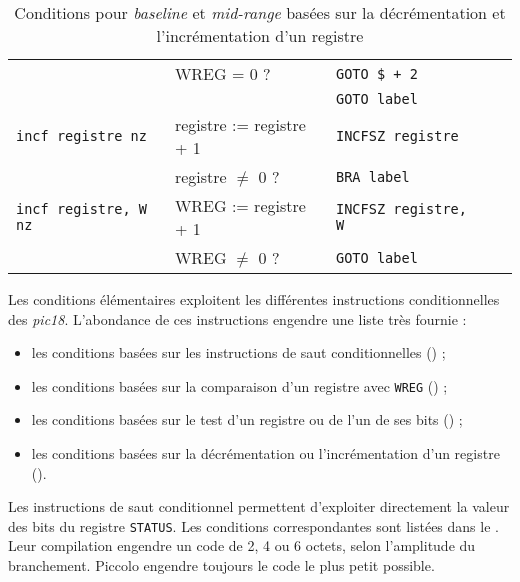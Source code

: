 \begin{table}[!ht]
\begin{tabular}{lllll}
    \rowcolor{\fondTableau}                           & WREG = 0 ?           &\texttt{GOTO \$ + 2}          \\
    \rowcolor{\fondTableau}                           &                      &\texttt{GOTO label}          \\
                           \texttt{incf registre nz}  & registre := registre + 1    &\texttt{INCFSZ registre}\\
                                                      & registre $\ne$ 0 ?              &\texttt{BRA label}   \\
    \rowcolor{\fondTableau}\texttt{incf registre, W nz}& WREG := registre + 1 &\texttt{INCFSZ registre, W}  \\
    \rowcolor{\fondTableau}                           & WREG $\ne$ 0 ?           &\texttt{GOTO label}         \\
    \hline
  \end{tabular}
  \caption{Conditions pour \emph{baseline} et \emph{mid-range} basées sur la décrémentation et l'incrémentation d'un registre}
\end{table}






Les conditions élémentaires exploitent les différentes instructions conditionnelles des \emph{pic18}. L'abondance de ces instructions engendre une liste très fournie :
\begin{itemize}
  \item les conditions basées sur les instructions de saut conditionnelles () ;
  \item les conditions basées sur la comparaison d'un registre avec \texttt{WREG} () ;
  \item les conditions basées sur le test d'un registre ou de l'un de ses bits () ;
  \item les conditions basées sur la décrémentation ou l'incrémentation d'un registre ().
\end{itemize}


Les instructions de saut conditionnel permettent d'exploiter directement la valeur des bits du registre \texttt{STATUS}. Les conditions correspondantes sont listées dans le . Leur compilation engendre un code de 2, 4 ou 6 octets, selon l'amplitude du branchement. Piccolo engendre toujours le code le plus petit possible.

